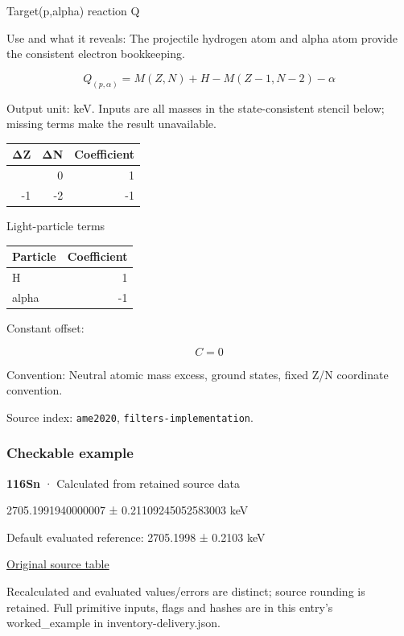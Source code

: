 \documentclass[
  11pt,
  letterpaper,
]{article}
\begin{document}
Target(p,alpha) reaction Q

Use and what it reveals: The projectile hydrogen atom and alpha atom
provide the consistent electron bookkeeping.

\[
Q_{(p,\alpha)}=M(Z,N)+H-M(Z-1,N-2)-\alpha
\]

Output unit: keV. Inputs are all masses in the state-consistent stencil
below; missing terms make the result unavailable.

\begin{longtable}[]{@{}rrr@{}}
\toprule\noalign{}
ΔZ & ΔN & Coefficient \\
\midrule\noalign{}
\endhead
\bottomrule\noalign{}
\endlastfoot
0 & 0 & 1 \\
-1 & -2 & -1 \\
\end{longtable}

Light-particle terms

\begin{longtable}[]{@{}lr@{}}
\toprule\noalign{}
Particle & Coefficient \\
\midrule\noalign{}
\endhead
\bottomrule\noalign{}
\endlastfoot
H & 1 \\
alpha & -1 \\
\end{longtable}

Constant offset:

\[
C=0
\]

Convention: Neutral atomic mass excess, ground states, fixed Z/N
coordinate convention.

Source index: \texttt{ame2020}, \texttt{filters-implementation}.

\subsubsection{Checkable example}\label{checkable-example-18}

\textbf{116Sn} · Calculated from retained source data

2705.1991940000007 ± 0.21109245052583003 keV

Default evaluated reference: 2705.1998 ± 0.2103 keV

\href{https://www-nds.iaea.org/amdc/ame2020/rct2_1.mas20.txt}{Original
source table}

Recalculated and evaluated values/errors are distinct; source rounding
is retained. Full primitive inputs, flags and hashes are in this entry's
worked\_example in inventory-delivery.json.
\end{document}
